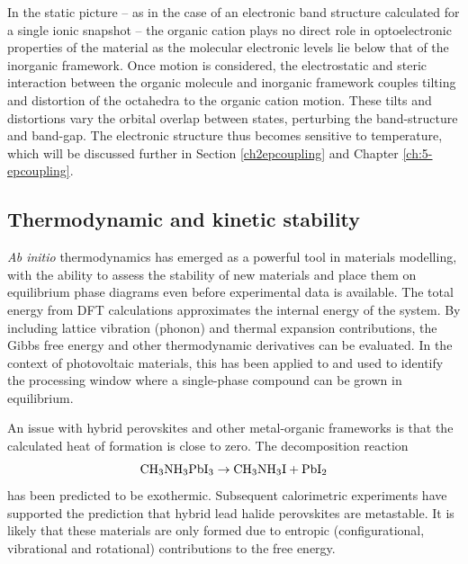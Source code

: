 In the static picture -- as in the case of an electronic band structure calculated for a single ionic snapshot -- the organic cation plays no direct role in optoelectronic properties of the material as the molecular electronic levels lie below that of the inorganic framework.
Once motion is considered, the electrostatic and steric interaction between the organic molecule and inorganic framework couples tilting and distortion of the octahedra to the organic cation motion.
These tilts and distortions vary the orbital overlap between states, perturbing the band-structure and band-gap.\autocite{Mosconi2014,Quarti2015a,Whalley2016,Saidi2016}
The electronic structure thus becomes sensitive to temperature, which will be discussed further in Section \ref{ch2epcoupling} and Chapter \ref{ch:5-epcoupling}.

\subsection{Thermodynamic and kinetic stability}

\textit{Ab initio} thermodynamics has emerged as a powerful tool in materials modelling, with the ability to assess the stability of new materials and place them on equilibrium phase diagrams even before experimental data is available. \autocite{Reuter2003,Kim2012,Jackson2015a}
The total energy from DFT calculations approximates the internal energy of the system. 
By including lattice vibration (phonon) and thermal expansion contributions, the Gibbs free energy 
and other thermodynamic derivatives can be evaluated.\autocite{Stoffel2010}
In the context of photovoltaic materials, this has been applied to  
and used to identify the processing window where a single-phase compound can be grown in equilibrium.\autocite{Jackson2014}

An issue with hybrid perovskites and other metal-organic frameworks is that the calculated heat of formation is close to zero.
The decomposition reaction 
\begin{equation}
\ce{CH3NH3PbI3} \rightarrow \ce{CH3NH3I} + \ce{PbI2}
\end{equation}
has been predicted to be exothermic.
%
Subsequent calorimetric experiments have supported the prediction that hybrid lead halide perovskites are metastable.\autocite{Nagabhushana2016}
%
It is likely that these materials are only formed due to entropic (configurational, vibrational and rotational) contributions
to the free energy.

